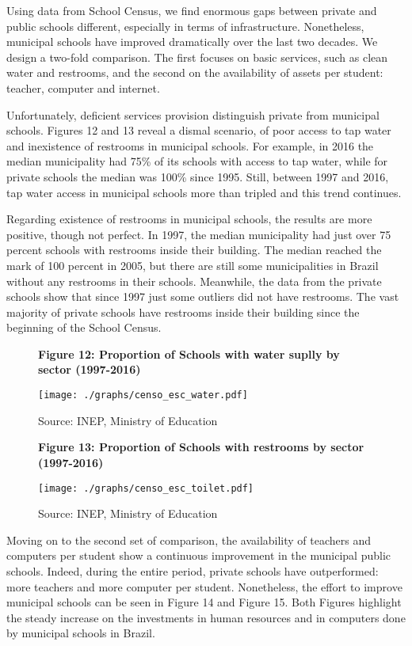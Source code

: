 \documentclass[12pt,]{book}
\begin{document}
Using data from School Census, we find enormous gaps between private and public schools different, especially in terms of infrastructure. Nonetheless, municipal schools have improved dramatically over the last two decades. We design a two-fold comparison. The first focuses on basic services, such as clean water and restrooms, and the second on the availability of assets per student: teacher, computer and internet.

Unfortunately, deficient services provision distinguish private from municipal schools. Figures 12 and 13 reveal a dismal scenario, of poor access to tap water and inexistence of restrooms in municipal schools. For example, in 2016 the median municipality had 75\% of its schools with access to tap water, while for private schools the median was 100\% since 1995. Still, between 1997 and 2016, tap water access in municipal schools more than tripled and this trend continues.

Regarding existence of restrooms in municipal schools, the results are more positive, though not perfect. In 1997, the median municipality had just over 75 percent schools with restrooms inside their building. The median reached the mark of 100 percent in 2005, but there are still some municipalities in Brazil without any restrooms in their schools. Meanwhile, the data from the private schools show that since 1997 just some outliers did not have restrooms. The vast majority of private schools have restrooms inside their building since the beginning of the School Census.

\begin{figure}
    \centering
    \textbf{\small Figure 12: Proportion of Schools with water suplly by sector (1997-2016)}\par\medskip
    \texttt{[image: ./graphs/censo\_esc\_water.pdf]}
    \caption*{\footnotesize \hfill Source: INEP, Ministry of Education}
\end{figure}

\begin{figure}
    \centering
    \textbf{\small Figure 13: Proportion of Schools with restrooms by sector (1997-2016)}\par\medskip
    \texttt{[image: ./graphs/censo\_esc\_toilet.pdf]}
    \caption*{\footnotesize \hfill Source: INEP, Ministry of Education}
\end{figure}

Moving on to the second set of comparison, the availability of teachers and computers per student show a continuous improvement in the municipal public schools. Indeed, during the entire period, private schools have outperformed: more teachers and more computer per student. Nonetheless, the effort to improve municipal schools can be seen in Figure 14 and Figure 15. Both Figures highlight the steady increase on the investments in human resources and in computers done by municipal schools in Brazil.
\end{document}
